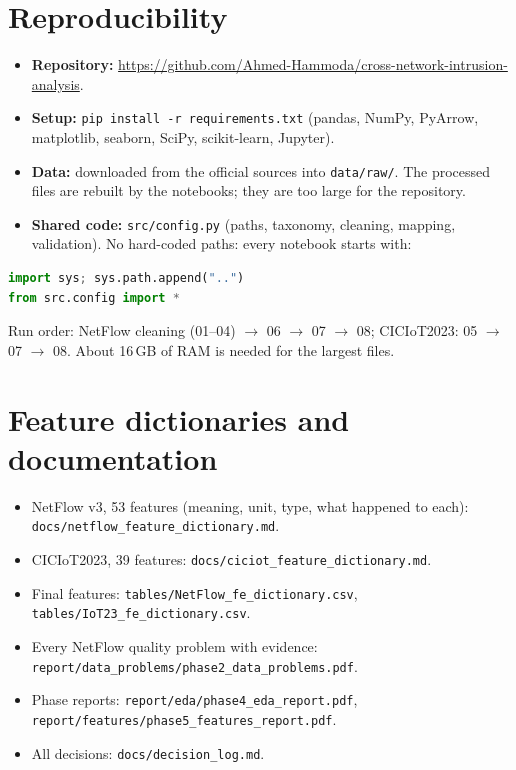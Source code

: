 \documentclass[12pt,a4paper]{article}
\newcommand{\file}[1]{\nolinkurl{#1}}
\begin{document}
\section{Reproducibility}
\begin{itemize}
  \item \textbf{Repository:} \url{https://github.com/Ahmed-Hammoda/cross-network-intrusion-analysis}.
  \item \textbf{Setup:} \texttt{pip install -r requirements.txt} (pandas, NumPy, PyArrow, matplotlib, seaborn, SciPy,
        scikit-learn, Jupyter).
  \item \textbf{Data:} downloaded from the official sources \cite{luay2025,ciciot2023} into \texttt{data/raw/}. The
        processed files are rebuilt by the notebooks; they are too large for the repository.
  \item \textbf{Shared code:} \texttt{src/config.py} (paths, taxonomy, cleaning, mapping, validation). No hard-coded
        paths: every notebook starts with:
\end{itemize}
\begin{lstlisting}[language=Python]
import sys; sys.path.append("..")
from src.config import *
\end{lstlisting}

Run order: NetFlow cleaning (01--04) $\rightarrow$ 06 $\rightarrow$ 07 $\rightarrow$ 08; CICIoT2023: 05 $\rightarrow$
07 $\rightarrow$ 08. About 16\,GB of RAM is needed for the largest files.

\section{Feature dictionaries and documentation}
\begin{itemize}
  \item NetFlow v3, 53 features (meaning, unit, type, what happened to each): \file{docs/netflow_feature_dictionary.md}.
  \item CICIoT2023, 39 features: \file{docs/ciciot_feature_dictionary.md}.
  \item Final features: \file{tables/NetFlow_fe_dictionary.csv}, \file{tables/IoT23_fe_dictionary.csv}.
  \item Every NetFlow quality problem with evidence: \file{report/data_problems/phase2_data_problems.pdf}.
  \item Phase reports: \file{report/eda/phase4_eda_report.pdf}, \file{report/features/phase5_features_report.pdf}.
  \item All decisions: \file{docs/decision_log.md}.
\end{itemize}
\end{document}
